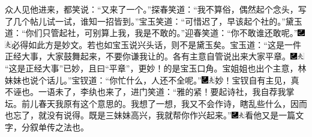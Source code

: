 众人见他进来，都笑说：``又来了一个。''探春笑道：``我不算俗，偶然起个念头，写了几个帖儿试一试，谁知一招皆到。''宝玉笑道：``可惜迟了，早该起个社的。''黛玉道：``你们只管起社，可别算上我，我是不敢的。''迎春笑道：``你不敢谁还敢呢。''{\includegraphics[width=3mm]{../Images/00003}\includegraphics[width=3mm]{../Images/00012}\footnotesize \kaishu 必得如此方是妙文。若也如宝玉说兴头话，则不是黛玉矣。}宝玉道：``这是一件正经大事，大家鼓舞起来，不要你谦我让的。各有主意自管说出来大家平章。{\includegraphics[width=3mm]{../Images/00003}\includegraphics[width=3mm]{../Images/00012}\footnotesize \kaishu ``这是正经大事''已妙，且曰``平章''，更妙！的是宝玉口角。}宝姐姐也出个主意，林妹妹也说个话儿。''宝钗道：``你忙什么，人还不全呢。''{\includegraphics[width=3mm]{../Images/00003}\includegraphics[width=3mm]{../Images/00012}\footnotesize \kaishu 妙！宝钗自有主见，真不诬也。}一语未了，李纨也来了，进门笑道：``雅的紧！要起诗社，我自荐我掌坛。前儿春天我原有这个意思的。我想了一想，我又不会作诗，瞎乱些什么，因而也忘了，就没有说得。既是三妹妹高兴，我就帮你作兴起来。''{\includegraphics[width=3mm]{../Images/00003}\includegraphics[width=3mm]{../Images/00012}\footnotesize \kaishu 看他又是一篇文字，分叙单传之法也。}

